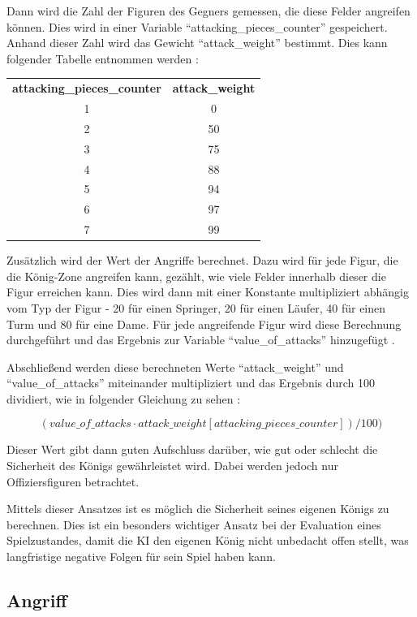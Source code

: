Dann wird die Zahl der Figuren des Gegners gemessen, die diese Felder angreifen können. Dies wird in einer Variable ``attacking\_pieces\_counter'' gespeichert. Anhand dieser Zahl wird das Gewicht ``attack\_weight'' bestimmt. Dies kann folgender Tabelle entnommen werden \cite{O.V.2019b}:

\begin{tabular}{c c}
\textbf{attacking\_pieces\_counter} & \textbf{attack\_weight}\\
1 & 0\\
2 & 50\\
3 & 75\\
4 & 88\\
5 & 94\\
6 & 97\\
7 & 99
\end{tabular}

Zusätzlich wird der Wert der Angriffe berechnet. Dazu wird für jede Figur, die die König-Zone angreifen kann, gezählt, wie viele Felder innerhalb dieser die Figur erreichen kann. Dies wird dann mit einer Konstante multipliziert abhängig vom Typ der Figur - 20 für einen Springer, 20 für einen Läufer, 40 für einen Turm und 80 für eine Dame. Für jede angreifende Figur wird diese Berechnung durchgeführt und das Ergebnis zur Variable ``value\_of\_attacks'' hinzugefügt \cite{O.V.2019b}.

Abschließend werden diese berechneten Werte ``attack\_weight'' und ``value\_of\_attacks'' miteinander multipliziert und das Ergebnis durch 100 dividiert, wie in folgender Gleichung zu sehen \cite{O.V.2019b}:

\begin{equation}
(value\_of\_attacks  \cdot  attack\_weight[attacking\_pieces\_counter]) / 100)
\end{equation}

Dieser Wert gibt dann guten Aufschluss darüber, wie gut oder schlecht die Sicherheit des Königs gewährleistet wird. Dabei werden jedoch nur Offiziersfiguren betrachtet.

Mittels dieser Ansatzes ist es möglich die Sicherheit seines eigenen Königs zu berechnen. Dies ist ein besonders wichtiger Ansatz bei der Evaluation eines Spielzustandes, damit die KI den eigenen König nicht unbedacht offen stellt, was langfristige negative Folgen für sein Spiel haben kann. 


\subsection{Angriff}\label{offense_evaluation}

